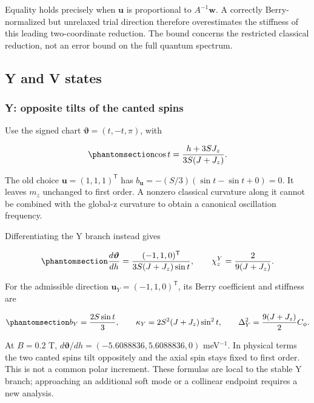 Equality holds precisely when \(\mathbf u\) is proportional to
\(A^{-1}\mathbf w\). A correctly Berry-normalized but unrelaxed trial
direction therefore overestimates the stiffness of this leading
two-coordinate reduction. The bound concerns the restricted classical
reduction, not an error bound on the full quantum spectrum.

\subsection{Y and V states}\label{sec-states}

\subsubsection{Y: opposite tilts of the canted
spins}\label{y-opposite-tilts-of-the-canted-spins}

Use the signed chart \(\boldsymbol\vartheta=(t,-t,\pi)\), with

\begin{equation}\phantomsection\label{eq-lswt-yv-pg-y-state}{
\cos t=\frac{h+3SJ_z}{3S(J+J_z)}.
}\end{equation}

The old choice \(\mathbf u=(1,1,1)^{\mathsf T}\) has
\(b_{\mathbf u}=-(S/3)(\sin t-\sin t+0)=0\). It leaves \(m_z\) unchanged
to first order. A nonzero classical curvature along it cannot be
combined with the global-z curvature to obtain a canonical oscillation
frequency.

Differentiating the Y branch instead gives

\begin{equation}\phantomsection\label{eq-lswt-yv-pg-y-response}{
\frac{d\boldsymbol\vartheta}{dh}
=\frac{(-1,1,0)^{\mathsf T}}{3S(J+J_z)\sin t},
\qquad
\chi_z^{Y}=\frac{2}{9(J+J_z)}.
}\end{equation}

For the admissible direction \(\mathbf u_Y=(-1,1,0)^{\mathsf T}\), its
Berry coefficient and stiffness are

\begin{equation}\phantomsection\label{eq-lswt-yv-pg-y-gap}{
b_Y=\frac{2S\sin t}{3},
\qquad
\kappa_Y=2S^2(J+J_z)\sin^2t,
\qquad
\Delta_Y^2=\frac{9(J+J_z)}{2}C_\phi.
}\end{equation}

At \(B=0.2\) T, \(d\boldsymbol\vartheta/dh=(-5.6088836,5.6088836,0)\)
meV\(^{-1}\). In physical terms the two canted spins tilt oppositely and
the axial spin stays fixed to first order. This is not a common polar
increment. These formulas are local to the stable Y branch; approaching
an additional soft mode or a collinear endpoint requires a new analysis.

